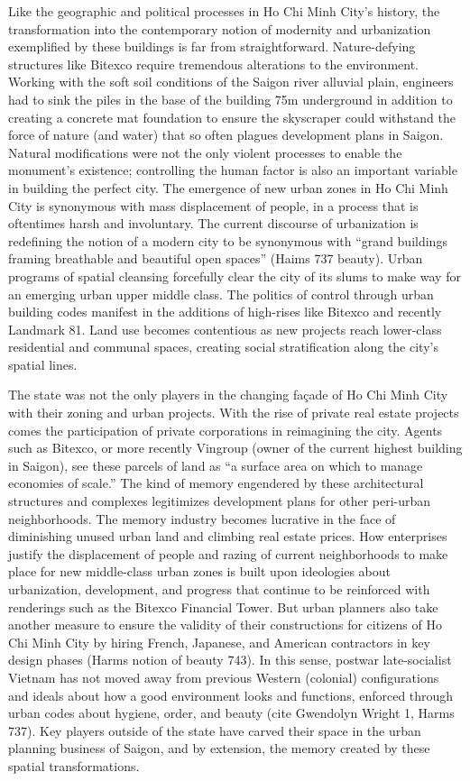 Like the geographic and political processes in Ho Chi Minh City’s history, the transformation into the contemporary notion of modernity and urbanization exemplified by these buildings is far from straightforward. Nature-defying structures like Bitexco require tremendous alterations to the environment. Working with the soft soil conditions of the Saigon river alluvial plain, engineers had to sink the piles in the base of the building 75m underground in addition to creating a concrete mat foundation to ensure the skyscraper could withstand the force of nature (and water) that so often plagues development plans in Saigon. Natural modifications were not the only violent processes to enable the monument’s existence; controlling the human factor is also an important variable in building the perfect city. The emergence of new urban zones in Ho Chi Minh City is synonymous with mass displacement of people, in a process that is oftentimes harsh and involuntary. The current discourse of urbanization is redefining the notion of a modern city to be synonymous with “grand buildings framing breathable and beautiful open spaces” (Haims 737 beauty). Urban programs of spatial cleansing forcefully clear the city of its slums to make way for an emerging urban upper middle class. The politics of control through urban building codes manifest in the additions of high-rises like Bitexco and recently Landmark 81. Land use becomes contentious as new projects reach lower-class residential and communal spaces, creating social stratification along the city’s spatial lines.

The state was not the only players in the changing façade of Ho Chi Minh City with their zoning and urban projects. With the rise of private real estate projects comes the participation of private corporations in reimagining the city. Agents such as Bitexco, or more recently Vingroup (owner of the current highest building in Saigon), see these parcels of land as “a surface area on which to manage economies of scale.” The kind of memory engendered by these architectural structures and complexes legitimizes development plans for other peri-urban neighborhoods. The memory industry becomes lucrative in the face of diminishing unused urban land and climbing real estate prices. How enterprises justify the displacement of people and razing of current neighborhoods to make place for new middle-class urban zones is built upon ideologies about urbanization, development, and progress that continue to be reinforced with renderings such as the Bitexco Financial Tower. But urban planners also take another measure to ensure the validity of their constructions for citizens of Ho Chi Minh City by hiring French, Japanese, and American contractors in key design phases (Harms notion of beauty 743). In this sense, postwar late-socialist Vietnam has not moved away from previous Western (colonial) configurations and ideals about how a good environment looks and functions, enforced through urban codes about hygiene, order, and beauty (cite Gwendolyn Wright 1, Harms 737). Key players outside of the state have carved their space in the urban planning business of Saigon, and by extension, the memory created by these spatial transformations.

